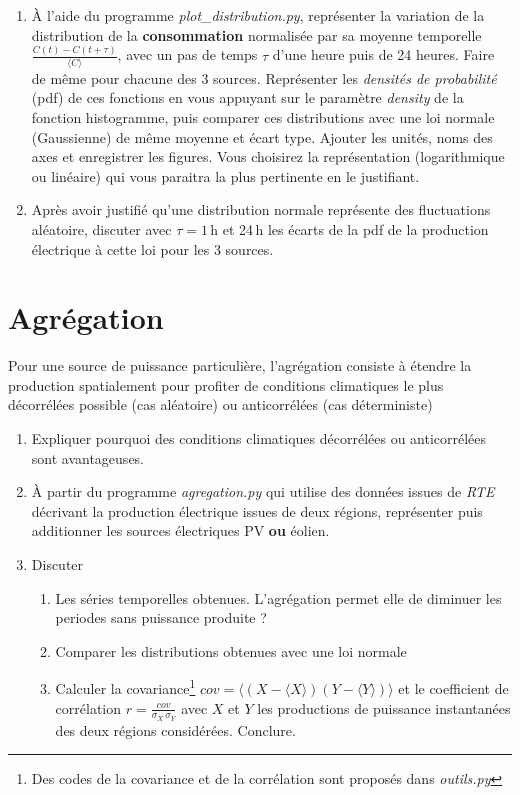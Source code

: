 \documentclass[12pt,a4]{article}
\newcommand{\tmtextbf}[1]{{\bfseries{#1}}}
\newcommand{\tmtextit}[1]{{\itshape{#1}}}
\begin{document}
\begin{enumerate}
  \item À l'aide du programme \tmtextit{plot\_distribution.py}, représenter
  la variation de la distribution de la \tmtextbf{consommation} normalisée
  par sa moyenne temporelle $\frac{C (t) - C (t + \tau)}{\langle C \rangle}$,
  avec un pas de temps $\tau$ d'une heure puis de 24 heures. Faire de même
  pour chacune des 3 sources. Représenter les \tmtextit{densités de probabilité}
  (pdf) de ces fonctions en vous appuyant sur le paramètre \tmtextit{density}
  de la fonction histogramme, puis comparer ces distributions avec une loi
  normale (Gaussienne) de même moyenne et écart type. Ajouter les unités,
  noms des axes et enregistrer les figures. Vous choisirez la représentation
  (logarithmique ou linéaire) qui vous paraitra la plus pertinente en le justifiant.
  
  \item Après avoir justifié qu'une distribution normale représente des
  fluctuations aléatoire, discuter avec $\tau = 1$\,h et 24\,h les écarts de la
  pdf de la production électrique à cette loi pour les 3 sources.
\end{enumerate}

\section{Agrégation}

Pour une source de puissance particulière, l'agrégation consiste à étendre la production spatialement pour profiter de conditions climatiques le plus décorrélées possible (cas aléatoire) ou anticorrélées (cas déterministe)
\begin{enumerate}
	\item Expliquer pourquoi des conditions climatiques décorrélées ou anticorrélées sont avantageuses.
	
  \item À partir du programme \tmtextit{agregation.py} qui utilise des
  données issues de \tmtextit{RTE} décrivant la production électrique
  issues de deux régions, représenter puis additionner les sources
  électriques PV \textbf{ou} éolien.
  
  \item Discuter
  \begin{enumerate}
    \item Les séries temporelles obtenues. L'agrégation permet elle de
    diminuer les periodes sans puissance produite ?
    
    \item Comparer les distributions obtenues avec une loi normale
    
    \item Calculer la covariance\footnote{Des codes de la covariance et de la corrélation sont proposés dans \textit{outils.py}} $cov=\langle (X-\langle X \rangle)(Y - \langle Y \rangle)\rangle $ et le coefficient de corrélation $r=\frac{cov}{\sigma_X \, \sigma_Y}$ avec $X$ et $Y$ les productions de puissance instantanées des deux régions considérées. Conclure.
  \end{enumerate}
\end{enumerate}
\end{document}
